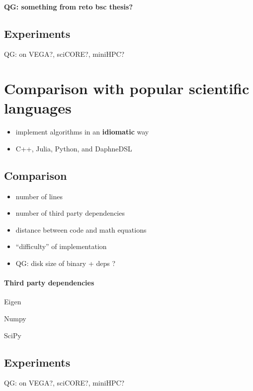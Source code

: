 \documentclass[conference,10pt]{IEEEtran}
\newcommand{\qg}[1]{{\color{blue} QG: #1}} %
\begin{document}
\paragraph{\qg{something from reto bsc thesis?}}

\subsection{Experiments}

\qg{on VEGA?, sciCORE?, miniHPC?}

\section{Comparison with popular scientific languages}

\begin{itemize}
    \item implement algorithms in an \textbf{idiomatic} way
    \item C++, Julia, Python, and DaphneDSL
\end{itemize}


\subsection{Comparison}

\begin{itemize}
\item number of lines
\item number of third party dependencies
\item distance between code and math equations
\item ``difficulty'' of implementation
\item \qg{disk size of binary + deps ?}
\end{itemize}

\paragraph{Third party dependencies}

Eigen \cite{guennebaud2010eigen}

Numpy \cite{harris2020array}

SciPy \cite{virtanen2020scipy}


\subsection{Experiments}

\qg{on VEGA?, sciCORE?, miniHPC?}
\end{document}
